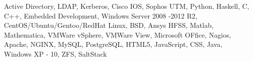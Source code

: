 
\begin{cventries}
    \begin{cvitems}
    \item {Active Directory, LDAP, Kerberos, Cisco IOS, Sophos UTM, Python, Haskell, C, C++, Embedded Development, Windows Server 2008 -2012 R2, CentOS/Ubuntu/Gentoo/RedHat Linux, BSD, Ansys HFSS, Matlab, Mathematica, VMWare vSphere, VMWare View, Microsoft OFfice, Nagios, Apache, NGINX, MySQL, PostgreSQL, HTML5, JavaScript, CSS, Java, Windows XP - 10, ZFS, SaltStack}
    \end{cvitems}
\end{cventries}
